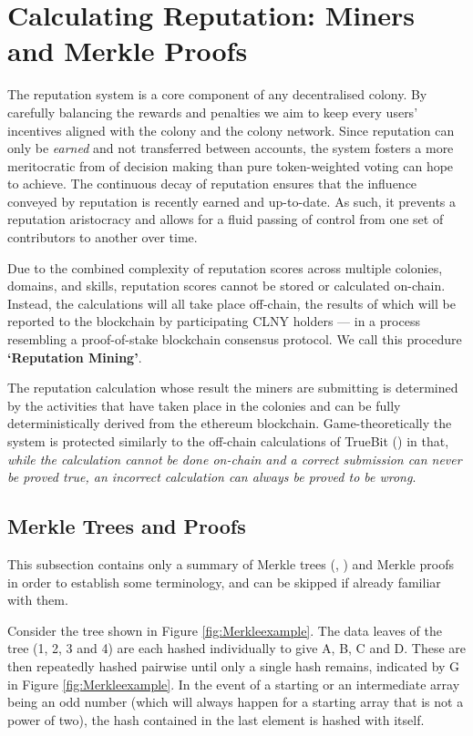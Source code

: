 
\section{Calculating Reputation: Miners and Merkle Proofs}\label{sec:reputationmining}
The reputation system is a core component of any decentralised colony. By carefully balancing the rewards and penalties we aim to keep every users' incentives aligned with the colony and the colony network. Since reputation can only be \emph{earned} and not transferred between accounts, the system fosters a more meritocratic from of decision making than pure token-weighted voting can hope to achieve. The continuous decay of reputation ensures that the influence conveyed by reputation is recently earned and up-to-date. As such, it prevents a reputation aristocracy and allows for a fluid passing of control from one set of contributors to another over time.


Due to the combined complexity of reputation scores across multiple colonies, domains, and skills, reputation scores cannot be stored or calculated on-chain. Instead, the calculations will all take place off-chain, the results of which will be reported to the blockchain by participating CLNY holders --- in a process resembling a proof-of-stake blockchain consensus protocol. We call this procedure \textbf{`Reputation Mining'}.

The reputation calculation whose result the miners are submitting is determined by the activities that have taken place in the colonies and can be fully deterministically derived from the ethereum blockchain. Game-theoretically the system is protected similarly to the off-chain calculations of TrueBit (\cite{TruebitWhitepaper}) in that, \emph{while the calculation cannot be done on-chain and a correct submission can never be proved true, an incorrect calculation can always be proved to be wrong}.


\subsection{Merkle Trees and Proofs}\label{sec:Merkle-summary}
This subsection contains only a summary of Merkle trees (\cite{MerkleTrees}, \cite{MerkleInEthereum}) and Merkle proofs in order to establish some terminology, and can be skipped if already familiar with them.

Consider the tree shown in Figure \ref{fig:Merkleexample}. The data leaves of the tree (1, 2, 3 and 4) are each hashed individually to give A, B, C and D. These are then repeatedly hashed pairwise until only a single hash remains, indicated by G in Figure \ref{fig:Merkleexample}. In the event of a starting or an intermediate array being an odd number (which will always happen for a starting array that is not a power of two), the hash contained in the last element is hashed with itself. 

